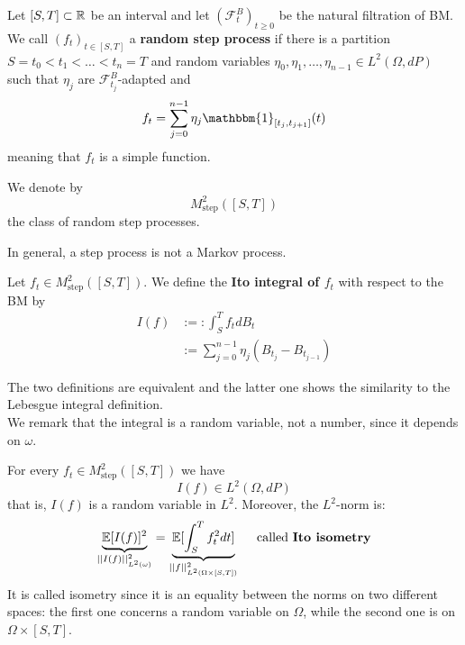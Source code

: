 \begin{DefBox}
    \begin{Def}
    Let $[S,T] \subset \mathbb{R}$ be an interval and let $(\mathcal{F}_t^B)_{t \geq 0}$ be the natural filtration of BM. We call $(f_t)_{t \in [S,T]}$ a \textbf{random step process} if there is a partition $S=t_0 < t_1 < \dots < t_n =T$ and random variables $\eta_0, \eta_1, \ldots, \eta_{n-1} \in L^2(\Omega, dP)$ such that $\eta_j$ are $\mathcal{F}_{t_j}^B$-adapted and 
    \begin{equation*}
        f_t = \sum_{j=0}^ {n-1} \eta_j \mathbbm{1}_{[t_j, t_{j+1}]}(t)
    \end{equation*}
    meaning that $f_t$ is a simple function. 
\end{Def}
\end{DefBox}
\begin{DefBox}
    \begin{Def}
    We denote by 
    \begin{equation*}
        M^2_{\text{step}}([S,T])
    \end{equation*}
    the class of random step processes.
\end{Def}
\end{DefBox}
\begin{remark}
    In general, a step process is not a Markov process.
\end{remark}
\begin{DefBox}
    \begin{Def}
    Let $f_t \in M^2_{\text{step}} ([S,T])$. We define the \textbf{Ito integral of $f_t$} with respect to the BM by
    \begin{align*}
        I(f)&:=: \int_S^T f_t dB_t \\
       &:= \sum_{j=0}^{n-1} \eta_j (B_{t_j} - B_{t_{j-1}})
    \end{align*}
\end{Def}
\end{DefBox}
The two definitions are equivalent and the latter one shows the similarity to the Lebesgue integral definition.  \\
We remark that the integral is a random variable, not a number, since it depends on $\omega$. 
\begin{PropBox}
    \begin{Proposition}
    For every $f_t \in  M^2_{\text{step}}([S,T]) $ we have 
    \begin{equation*}
        I(f) \in L^2(\Omega, dP)
    \end{equation*}
    that is, $I(f)$ is a random variable in $L^2$.
    Moreover, the $L^2$-norm is:
    \begin{equation*}
        \underbrace{\mathbb{E}[I(f)]^2}_{||I(f)||^2_{L^2(\omega)}} = \underbrace{\mathbb{E}[\int_S^T f_t^2 dt]}_{||f||^2_{L^2(\Omega \times [S,T])}} \quad \text{ called \textbf{Ito isometry}}
    \end{equation*}
    It is called isometry since it is an equality between the norms on two different spaces: the first one concerns a random variable on $\Omega$, while the second one is on $\Omega \times [S,T]$. 
\end{Proposition}
\end{PropBox}
